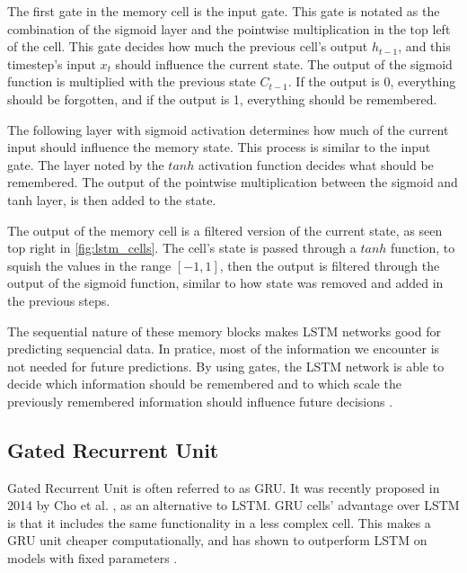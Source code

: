 The first gate in the memory cell is the input gate. This gate is notated as the combination of the sigmoid layer and the pointwise multiplication in the top left of the cell. This gate decides how much the previous cell's output $h_{t-1}$, and this timestep's input $x_t$ should influence the current state. The output of the sigmoid function is multiplied with the previous state $C_{t-1}$. If the output is 0, everything should be forgotten, and if the output is 1, everything should be remembered. 

The following layer with sigmoid activation determines how much of the current input should influence the memory state. This process is similar to the input gate. The layer noted by the $tanh$ activation function decides what should be remembered. The output of the pointwise multiplication between the sigmoid and tanh layer, is then added to the state.

The output of the memory cell is a filtered version of the current state, as seen top right in \ref{fig:lstm_cells}. The cell's state is passed through a $tanh$ function, to squish the values in the range $[-1, 1]$, then the output is filtered through the output of the sigmoid function, similar to how state was removed and added in the previous steps. 

The sequential nature of these memory blocks makes LSTM networks good for predicting sequencial data. In pratice, most of the information we encounter is not needed for future predictions. By using gates, the LSTM network is able to decide which information should be remembered and to which scale the previously remembered information should influence future decisions \cite{gers_learning_1999} \cite{_understanding_2015}.

\subsection{Gated Recurrent Unit}

Gated Recurrent Unit is often referred to as GRU. It was recently proposed in 2014 by Cho et al. \cite{cho_learning_2014}, as an alternative to LSTM. GRU cells' advantage over LSTM is that it includes the same functionality in a less complex cell. This makes a GRU unit cheaper computationally, and has shown to outperform LSTM on models with fixed parameters \cite{chung_empirical_2014}. 

